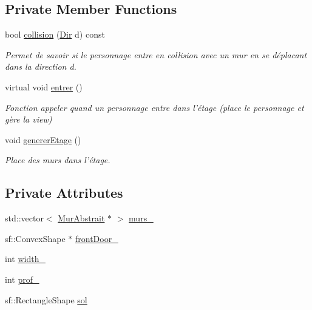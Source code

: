 \subsection*{Private Member Functions}
\begin{DoxyCompactItemize}
\item 
bool \hyperlink{classEtage_ae6dae7353fd5e19e9a3e24ad28b3523e}{collision} (\hyperlink{Espace_8h_a7cf6e8c5a5bc5e7b2afef3647870b1c4}{Dir} d) const 
\begin{DoxyCompactList}\small\item\em Permet de savoir si le personnage entre en collision avec un mur en se déplacant dans la direction d. \end{DoxyCompactList}\item 
\hypertarget{classEtage_acc07b13f8ce22295b052d364e5b67281}{virtual void \hyperlink{classEtage_acc07b13f8ce22295b052d364e5b67281}{entrer} ()}\label{classEtage_acc07b13f8ce22295b052d364e5b67281}

\begin{DoxyCompactList}\small\item\em Fonction appeler quand un personnage entre dans l'étage (place le personnage et gère la view) \end{DoxyCompactList}\item 
\hypertarget{classEtage_a323ca8f266bfd556d304cdd1af04ceaf}{void \hyperlink{classEtage_a323ca8f266bfd556d304cdd1af04ceaf}{generer\-Etage} ()}\label{classEtage_a323ca8f266bfd556d304cdd1af04ceaf}

\begin{DoxyCompactList}\small\item\em Place des murs dans l'étage. \end{DoxyCompactList}\end{DoxyCompactItemize}
\subsection*{Private Attributes}
\begin{DoxyCompactItemize}
\item 
std\-::vector$<$ \hyperlink{classMurAbstrait}{Mur\-Abstrait} $\ast$ $>$ \hyperlink{classEtage_a2e8c120a9956af256550bea2d0b4e1ec}{murs\-\_\-}
\item 
sf\-::\-Convex\-Shape $\ast$ \hyperlink{classEtage_a66b0fb3c8567a835d0f65585a3ca7ec3}{front\-Door\-\_\-}
\item 
int \hyperlink{classEtage_a5f820189aca5b74a16442b7262bb6ad5}{width\-\_\-}
\item 
int \hyperlink{classEtage_aede3188a63f55b1d17d9b2bf6a256976}{prof\-\_\-}
\item 
sf\-::\-Rectangle\-Shape \hyperlink{classEtage_abf98991bae9845f98d70ef6801108b6a}{sol}
\end{DoxyCompactItemize}
